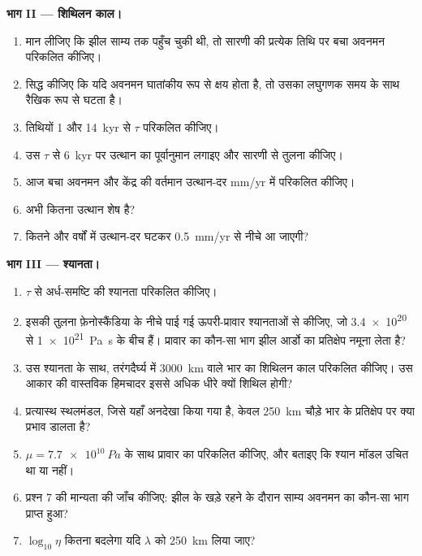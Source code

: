 \begin{problem}
\medskip\noindent\textbf{भाग II --- शिथिलन काल।}
\begin{enumerate}[resume]
  \item मान लीजिए कि झील साम्य तक पहुँच चुकी थी, तो
        सारणी की प्रत्येक तिथि पर बचा अवनमन परिकलित कीजिए।
  \item सिद्ध कीजिए कि यदि अवनमन घातांकीय रूप से क्षय होता है, तो उसका लघुगणक
        समय के साथ रैखिक रूप से घटता है।
  \item तिथियों 1 और \qty{14}{kyr} से $\tau$ परिकलित कीजिए।
  \item उस $\tau$ से \qty{6}{kyr} पर उत्थान का पूर्वानुमान लगाइए और
        सारणी से तुलना कीजिए।
  \item आज बचा अवनमन और केंद्र की वर्तमान उत्थान-दर
        \unit{mm/yr} में परिकलित कीजिए।
  \item अभी कितना उत्थान शेष है?
  \item कितने और वर्षों में उत्थान-दर घटकर
        \qty{0.5}{mm/yr} से नीचे आ जाएगी?
\end{enumerate}

\medskip\noindent\textbf{भाग III --- श्यानता।}
\begin{enumerate}[resume]
  \item $\tau$ से अर्ध-समष्टि की श्यानता परिकलित कीजिए।
  \item इसकी तुलना फ़ेनोस्कैंडिया के नीचे पाई गई ऊपरी-प्रावार श्यानताओं से कीजिए, जो
        \num{3.4e20} से \qty{1e21}{Pa.s} के बीच हैं। प्रावार का कौन-सा भाग
        झील आर्डो का प्रतिक्षेप नमूना लेता है?
  \item उस श्यानता के साथ, तरंगदैर्घ्य में \qty{3000}{km} वाले भार का
        शिथिलन काल परिकलित कीजिए। उस आकार की वास्तविक हिमचादर इससे
        अधिक धीरे क्यों शिथिल होगी?
  \item प्रत्यास्थ स्थलमंडल, जिसे यहाँ अनदेखा किया गया है, केवल
        \qty{250}{km} चौड़े भार के प्रतिक्षेप पर क्या प्रभाव डालता है?
  \item $\mu = \qty{7.7e10}{Pa}$ के साथ प्रावार का  परिकलित कीजिए,
        और बताइए कि श्यान मॉडल उचित था या नहीं।
  \item प्रश्न 7 की मान्यता की जाँच कीजिए: झील के खड़े रहने के दौरान साम्य
        अवनमन का कौन-सा भाग प्राप्त हुआ?
  \item $\log_{10}\eta$ कितना बदलेगा यदि $\lambda$ को
        \qty{250}{km} लिया जाए?
\end{enumerate}


\end{problem}
